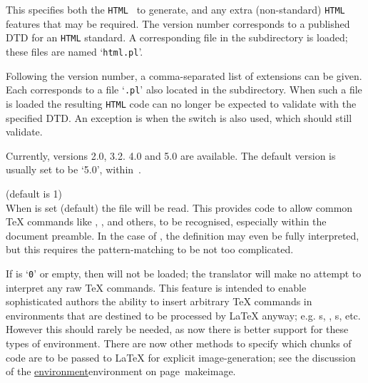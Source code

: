 \begin{htmllist}%
%
%
%
\item [ -html\_version \texttt{(2.0|3.2|4.0|5.0)[,(math|i18n)]*}\label{cs_htmlversion}]
~\\\\
This specifies both the \texttt{HTML}~ to generate, 
and any extra (non-standard) \texttt{HTML} features that may be required.\html{\\}
The version number corresponds to a published DTD for an \texttt{HTML} standard.
A corresponding \Perl{} file in the  subdirectory is loaded;
these files are named `\texttt{html}\texttt{.pl}'.

Following the version number, a comma-separated list of extensions
can be given. Each corresponds to a file `\texttt{.pl}' 
also located in the  subdirectory. 
When such a file is loaded the resulting \texttt{HTML} code 
can no longer be expected to validate with the specified DTD. 
An exception is  when the  
switch is also used, which should still validate.

Currently, versions 2.0, 3.2. 4.0 and 5.0 are available.
The default version is usually set to be `5.0', within \,.%

%
%

\item [ -no\_tex\_defs\label{cs_notexdefs}]
 (default is 1)\\
When  is set (default) the file  will be read.
This provides code to allow common \TeX{} commands like , ,
 and others, to be recognised, especially within the document preamble.
In the case of , the definition may even be fully interpreted,
but this requires the pattern-matching to be not too complicated.

If  is `\texttt{0}' or empty, then  will not be loaded;
the translator will make no attempt to interpret any raw \TeX{} commands.  
This feature is intended to enable sophisticated authors the ability to insert 
arbitrary \TeX{} commands in environments that are destined 
to be processed by \LaTeX{} anyway; 
e.g. s, , s, etc.
However this should rarely be needed, as now there is better support for these
types of environment. There are now other methods to specify which chunks of code 
are to be passed to \LaTeX{} for explicit image-generation; 
see the discussion of the  
\hyperref[page]{environment}{environment on page~}{}{makeimage}.



\end{htmllist}
